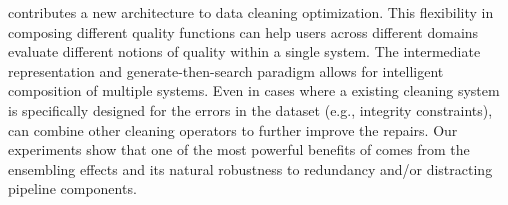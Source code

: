 \sys contributes a new architecture to data cleaning optimization.
 This flexibility in composing different quality functions can help users across different domains evaluate different notions of quality within a single system. 
 The intermediate representation and generate-then-search paradigm allows for intelligent composition of multiple systems. 
Even in cases where a existing cleaning system is specifically designed for the errors in the dataset (e.g., integrity constraints), \sys can combine other cleaning operators to further improve the repairs.  Our experiments show that one of the most powerful benefits of \sys comes from the ensembling effects and its natural robustness to redundancy and/or distracting pipeline components.


